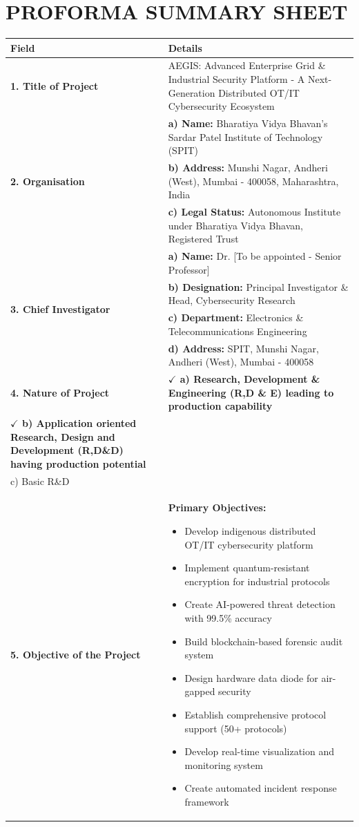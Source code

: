 \documentclass[12pt,a4paper]{article}
\begin{document}
\section{PROFORMA SUMMARY SHEET}

\begin{longtable}{|p{3cm}|p{12cm}|}
\hline
\rowcolor{lightblue}
\textbf{Field} & \textbf{Details} \\
\hline
\endhead

\textbf{1. Title of Project} & 
AEGIS: Advanced Enterprise Grid \& Industrial Security Platform - A Next-Generation Distributed OT/IT Cybersecurity Ecosystem \\
\hline

\multirow{3}{*}{\textbf{2. Organisation}} & 
\textbf{a) Name:} Bharatiya Vidya Bhavan's Sardar Patel Institute of Technology (SPIT) \\
& \textbf{b) Address:} Munshi Nagar, Andheri (West), Mumbai - 400058, Maharashtra, India \\
& \textbf{c) Legal Status:} Autonomous Institute under Bharatiya Vidya Bhavan, Registered Trust \\
\hline

\multirow{4}{*}{\textbf{3. Chief Investigator}} & 
\textbf{a) Name:} Dr. [To be appointed - Senior Professor] \\
& \textbf{b) Designation:} Principal Investigator \& Head, Cybersecurity Research \\
& \textbf{c) Department:} Electronics \& Telecommunications Engineering \\
& \textbf{d) Address:} SPIT, Munshi Nagar, Andheri (West), Mumbai - 400058 \\
\hline

\textbf{4. Nature of Project} & 
\textbf{$\checkmark$ a) Research, Development \& Engineering (R,D \& E) leading to production capability}\\
\textbf{$\checkmark$ b) Application oriented Research, Design and Development (R,D\&D) having production potential}\\
c) Basic R\&D \\
\hline

\textbf{5. Objective of the Project} & 
\textbf{Primary Objectives:}
\begin{itemize}[leftmargin=1em]
    \item Develop indigenous distributed OT/IT cybersecurity platform
    \item Implement quantum-resistant encryption for industrial protocols
    \item Create AI-powered threat detection with 99.5\% accuracy
    \item Build blockchain-based forensic audit system
    \item Design hardware data diode for air-gapped security
    \item Establish comprehensive protocol support (50+ protocols)
    \item Develop real-time visualization and monitoring system
    \item Create automated incident response framework
\end{itemize} \\
\hline


\end{longtable}
\end{document}
